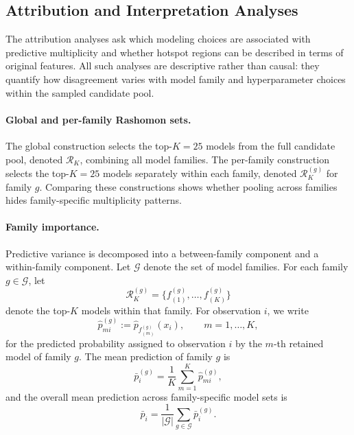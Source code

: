 \subsection{Attribution and Interpretation Analyses}
\label{sec:meth-attribution}

The attribution analyses ask which modeling choices are associated with predictive
multiplicity and whether hotspot regions can be described in terms of original features. All
such analyses are descriptive rather than causal: they quantify how disagreement varies
with model family and hyperparameter choices within the sampled candidate pool.

\paragraph{Global and per-family Rashomon sets.}
The global construction selects the top-\(K=25\) models from the full candidate pool,
denoted \(\mathcal{R}_K\), combining all model families. The per-family construction
selects the top-\(K=25\) models separately within each family, denoted
\(\mathcal{R}^{(g)}_K\) for family \(g\). Comparing these constructions shows whether
pooling across families hides family-specific multiplicity patterns.

\paragraph{Family importance.}
Predictive variance is decomposed into a between-family component and a within-family
component. Let \(\mathcal{G}\) denote the set of model families. For each family
\(g \in \mathcal{G}\), let
\[
\mathcal{R}^{(g)}_K =
\{f_{(1)}^{(g)}, \ldots, f_{(K)}^{(g)}\}
\]
denote the top-\(K\) models within that family. For observation \(i\), we write
\[
\hat{p}_{mi}^{(g)} := \hat{p}_{f_{(m)}^{(g)}}(x_i),
\qquad m = 1,\ldots,K,
\]
for the predicted probability assigned to observation \(i\) by the \(m\)-th retained model
of family \(g\). The mean prediction of family \(g\) is
\[
\bar{p}^{(g)}_i =
\frac{1}{K}
\sum_{m=1}^{K}
\hat{p}^{(g)}_{mi},
\]
and the overall mean prediction across family-specific model sets is
\[
\bar{p}_{i} =
\frac{1}{|\mathcal{G}|}
\sum_{g\in \mathcal{G}}
\bar{p}^{(g)}_i.
\]

